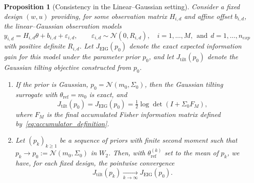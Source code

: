 \documentclass[a4paper,11pt]{article}
\newtheorem{proposition}{Proposition}
\begin{document}
\begin{proposition}[Consistency in the Linear--Gaussian setting]
\label{prop:consistency_LG}
Consider a fixed design $(w, u)$ providing, for some observation matrix $H_{i, d}$ and  affine offset $b_{i,d}$, the linear--Gaussian observation models
\[
y_{i, d} = H_{i, d} \theta + b_{i, d} + \varepsilon_{i, d},
\qquad \varepsilon_{i, d} \sim \mathcal N(0,R_{i, d}),
\quad i=1,\dots,M, ~~\text{and}~~ d=1,\dots,n_{exp}
\]
with positive definite $R_{i, d}$. Let $J_{\mathrm{EIG}}(p_0)$ denote the exact expected information gain for this model under the parameter prior $p_0$, and let $J_{\mathrm{tilt}}(p_0)$ denote the Gaussian tilting objective constructed
from $p_0$.
\begin{enumerate}
\item
If the prior is Gaussian, $p_0=\mathcal N(m_0,\Sigma_0)$, then the Gaussian tilting
surrogate with $\theta_\mathrm{ref}=m_0$ is exact, and
\[
J_{\mathrm{tilt}}(p_0) = J_{\mathrm{EIG}}(p_0) = \tfrac{1}{2}\log\det(I + \Sigma_0 F_M),
\]
where \(F_M\) is the final accumulated Fisher information matrix defined
by~\eqref{eq:accumulator_definition}.
\item
Let $(p_k)_{k\ge1}$ be a sequence of priors with finite second moment such that
$p_k \to p_0:=\mathcal N(m_0,\Sigma_0)$ in $W_2$. Then, with \(\theta_{\mathrm{ref}}^{(k)}\) set to the mean of \(p_k\), we have,
for each fixed design, the pointwise convergence
\[
J_{\mathrm{tilt}}(p_k)
\xrightarrow[k\to\infty]{}
J_{\mathrm{EIG}}(p_0).
\]
\end{enumerate}
\end{proposition} 
\end{document}
